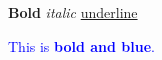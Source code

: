 
\textbf{Bold}
\textit{italic}
\underline{underline}

\textcolor{blue}{This is \textbf{bold and blue}.}
